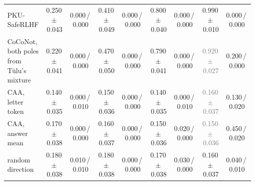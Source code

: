 \begin{tabular}{@{}lcccccccc@{}}
PKU-SafeRLHF & 0.250\,{\scriptsize$\pm$\,0.043} & {\scriptsize 0.000\,/\,0.000} & 0.410\,{\scriptsize$\pm$\,0.049} & {\scriptsize 0.000\,/\,0.000} & 0.800\,{\scriptsize$\pm$\,0.040} & {\scriptsize 0.000\,/\,0.000} & 0.990\,{\scriptsize$\pm$\,0.010} & {\scriptsize 0.000\,/\,0.000} \\
CoCoNot, both poles from T\"ulu's mixture & 0.220\,{\scriptsize$\pm$\,0.041} & {\scriptsize 0.000\,/\,0.000} & 0.470\,{\scriptsize$\pm$\,0.050} & {\scriptsize 0.000\,/\,0.000} & 0.790\,{\scriptsize$\pm$\,0.041} & {\scriptsize 0.000\,/\,0.000} & \textcolor{gray}{0.920\,{\scriptsize$\pm$\,0.027}} & {\scriptsize 0.200\,/\,0.000} \\
CAA, letter token & 0.140\,{\scriptsize$\pm$\,0.035} & {\scriptsize 0.000\,/\,0.010} & 0.150\,{\scriptsize$\pm$\,0.036} & {\scriptsize 0.000\,/\,0.000} & 0.140\,{\scriptsize$\pm$\,0.035} & {\scriptsize 0.000\,/\,0.010} & \textcolor{gray}{0.160\,{\scriptsize$\pm$\,0.037}} & {\scriptsize 0.130\,/\,0.020} \\
CAA, answer mean & 0.170\,{\scriptsize$\pm$\,0.038} & {\scriptsize 0.000\,/\,0.000} & 0.160\,{\scriptsize$\pm$\,0.037} & {\scriptsize 0.000\,/\,0.000} & 0.150\,{\scriptsize$\pm$\,0.036} & {\scriptsize 0.020\,/\,0.000} & \textcolor{gray}{0.150\,{\scriptsize$\pm$\,0.036}} & {\scriptsize 0.450\,/\,0.020} \\
random direction & 0.180\,{\scriptsize$\pm$\,0.038} & {\scriptsize 0.010\,/\,0.010} & 0.180\,{\scriptsize$\pm$\,0.038} & {\scriptsize 0.000\,/\,0.000} & 0.170\,{\scriptsize$\pm$\,0.038} & {\scriptsize 0.030\,/\,0.000} & 0.160\,{\scriptsize$\pm$\,0.037} & {\scriptsize 0.040\,/\,0.010} \\
\bottomrule
\end{tabular}
